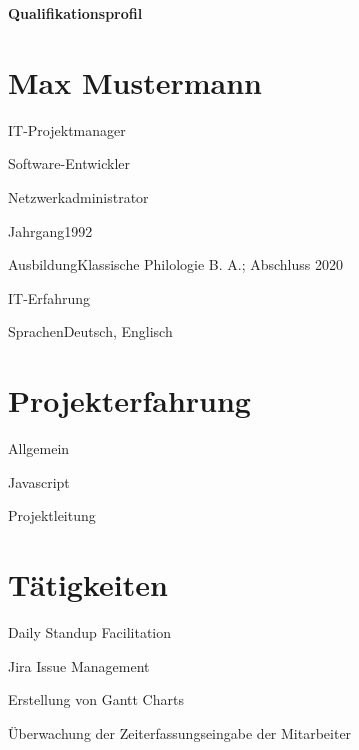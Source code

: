 \documentclass{germanskillsprofile}
\begin{document}
\textbf{\sffamily\huge Qualifikationsprofil} \hspace*{\fill} \textbf{\normalsize\monthyear}

\vspace{2em}

\section*{Max Mustermann}

  \begin{listnobullet}
    \item IT-Projektmanager
    \item Software-Entwickler
    \item Netzwerkadministrator
  \end{listnobullet}

  \vspace{1.5em}

  \begin{sptable}{Jahrgang}1992\end{sptable}
  \begin{sptable}{Ausbildung}Klassische Philologie B. A.; Abschluss 2020\end{sptable}
  \begin{sptable}{IT-Erfahrung}\end{sptable}
  \begin{sptable}{Sprachen}Deutsch, Englisch\end{sptable}

\section*{Projekterfahrung}

  \begin{sptable}{Allgemein}\end{sptable}
  \begin{sptable}{Javascript}\end{sptable}
  \begin{sptable}{Projektleitung}\end{sptable}

\section*{Tätigkeiten}

  \begin{listbullet}
    \item Daily Standup Facilitation
    \item Jira Issue Management
    \item Erstellung von Gantt Charts
    \item Überwachung der Zeiterfassungseingabe der Mitarbeiter
  \end{listbullet}
\end{document}

